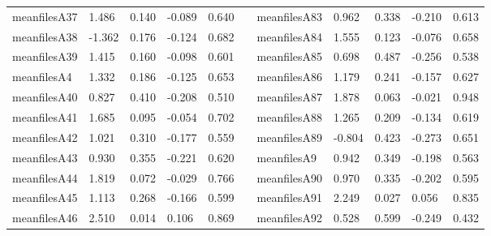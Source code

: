 \begin{table}[h!]
\begin{tabular}{lllllllllll}
meanfilesA37  & 1.486            & 0.140            & -0.089           & 0.640            &           & meanfilesA83  & 0.962            & 0.338            & -0.210           & 0.613            \\
meanfilesA38  & -1.362           & 0.176            & -0.124           & 0.682            &           & meanfilesA84  & 1.555            & 0.123            & -0.076           & 0.658            \\
meanfilesA39  & 1.415            & 0.160            & -0.098           & 0.601            &           & meanfilesA85  & 0.698            & 0.487            & -0.256           & 0.538            \\
meanfilesA4   & 1.332            & 0.186            & -0.125           & 0.653            &           & meanfilesA86  & 1.179            & 0.241            & -0.157           & 0.627            \\
meanfilesA40  & 0.827            & 0.410            & -0.208           & 0.510            &           & meanfilesA87  & 1.878            & 0.063            & -0.021           & 0.948            \\
meanfilesA41  & 1.685            & 0.095            & -0.054           & 0.702            &           & meanfilesA88  & 1.265            & 0.209            & -0.134           & 0.619            \\
meanfilesA42  & 1.021            & 0.310            & -0.177           & 0.559            &           & meanfilesA89  & -0.804           & 0.423            & -0.273           & 0.651            \\
meanfilesA43  & 0.930            & 0.355            & -0.221           & 0.620            &           & meanfilesA9   & 0.942            & 0.349            & -0.198           & 0.563            \\
meanfilesA44  & 1.819            & 0.072            & -0.029           & 0.766            &           & meanfilesA90  & 0.970            & 0.335            & -0.202           & 0.595            \\
meanfilesA45  & 1.113            & 0.268            & -0.166           & 0.599            &           & meanfilesA91  & 2.249            & 0.027            & 0.056            & 0.835            \\
meanfilesA46  & 2.510            & 0.014            & 0.106            & 0.869            &           & meanfilesA92  & 0.528            & 0.599            & -0.249           & 0.432            \\

\end{tabular}
\end{table}
